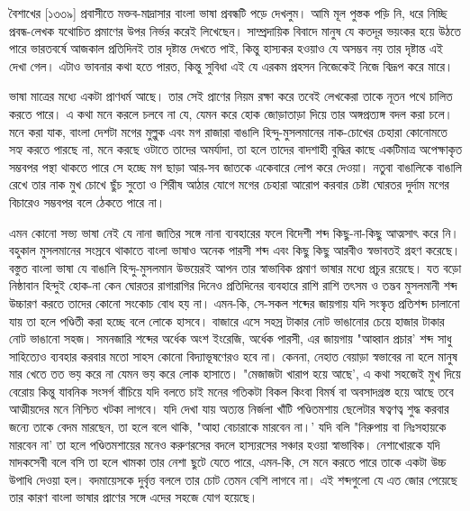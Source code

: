 \documentclass[a4paper,11pt]{article}
\date{\today}
\begin{document}
%
\maketitle
\pagestyle{fancy}
\begin{multicols}{3}{

\begin{spacing}{1.15}
\bn বৈশাখের [১৩৩৯] প্রবাসীতে মক্তব-মাদ্রাসার বাংলা ভাষা প্রবন্ধটি পড়ে দেখলুম। আমি মূল পুস্তক পড়ি নি, ধরে নিচ্ছি প্রবন্ধ-লেখক যথোচিত প্রমাণের উপর নির্ভর করেই লিখেছেন। সাম্প্রদায়িক বিবাদে মানুষ যে কতদূর ভয়ংকর হয়ে উঠতে পারে ভারতবর্ষে আজকাল প্রতিদিনই তার দৃষ্টান্ত দেখতে পাই, কিন্তু হাস্যকর হওয়াও যে অসম্ভব নয় তার দৃষ্টান্ত এই দেখা গেল। এটাও ভাবনার কথা হতে পারত, কিন্তু সুবিধা এই যে এরকম প্রহসন নিজেকেই নিজে বিদ্রূপ করে মারে।

ভাষা মাত্রের মধ্যে একটা প্রাণধর্ম আছে। তার সেই প্রাণের নিয়ম রক্ষা করে তবেই লেখকেরা তাকে নূতন পথে চালিত করতে পারে। এ কথা মনে করলে চলবে না যে, যেমন করে হোক জোড়াতাড়া দিয়ে তার অঙ্গপ্রত্যঙ্গ বদল করা চলে। মনে করা যাক, বাংলা দেশটা মগের মুল্লুক এবং মগ রাজারা বাঙালি হিন্দু-মুসলমানের নাক-চোখের চেহারা কোনোমতে সহ্য করতে পারছে না, মনে করছে ওটাতে তাদের অমর্যাদা, তা হলে তাদের বাদশাহী বুদ্ধির কাছে একটিমাত্র অপেক্ষাকৃত সম্ভবপর পন্থা থাকতে পারে সে হচ্ছে মগ ছাড়া আর-সব জাতকে একেবারে লোপ করে দেওয়া। নতুবা বাঙালিকে বাঙালি রেখে তার নাক মুখ চোখে ছুঁচ সুতো ও শিরীষ আঠার যোগে মগের চেহারা আরোপ করবার চেষ্টা ঘোরতর দুর্দাম মগের বিচারেও সম্ভবপর বলে ঠেকতে পারে না।

এমন কোনো সভ্য ভাষা নেই যে নানা জাতির সঙ্গে নানা ব্যবহারের ফলে বিদেশী শব্দ কিছু-না-কিছু আত্মসাৎ করে নি। বহুকাল মুসলমানের সংস্রবে থাকাতে বাংলা ভাষাও অনেক পারসী শব্দ এবং কিছু কিছু আরবীও স্বভাবতই গ্রহণ করেছে। বস্তুত বাংলা ভাষা যে বাঙালি হিন্দু-মুসলমান উভয়েরই আপন তার স্বাভাবিক প্রমাণ ভাষার মধ্যে প্রচুর রয়েছে। যত বড়ো নিষ্ঠাবান হিন্দুই হোক-না কেন ঘোরতর রাগারাগির দিনেও প্রতিদিনের ব্যবহারে রাশি রাশি তৎসম ও তদ্ভব মুসলমানী শব্দ উচ্চারণ করতে তাদের কোনো সংকোচ বোধ হয় না। এমন-কি, সে-সকল শব্দের জায়গায় যদি সংস্কৃত প্রতিশব্দ চালানো যায় তা হলে পণ্ডিতী করা হচ্ছে বলে লোকে হাসবে। বাজারে এসে সহস্র টাকার নোট ভাঙানোর চেয়ে হাজার টাকার নোট ভাঙানো সহজ। সমনজারি শব্দের অর্ধেক অংশ ইংরেজি, অর্ধেক পারসী, এর জায়গায় "আহ্বান প্রচার' শব্দ সাধু সাহিত্যেও ব্যবহার করবার মতো সাহস কোনো বিদ্যাভূষণেরও হবে না। কেননা, নেহাত বেয়াড়া স্বভাবের না হলে মানুষ মার খেতে তত ভয় করে না যেমন ভয় করে লোক হাসাতে। "মেজাজটা খারাপ হয়ে আছে', এ কথা সহজেই মুখ দিয়ে বেরোয় কিন্তু যাবনিক সংসর্গ বাঁচিয়ে যদি বলতে চাই মনের গতিকটা বিকল কিংবা বিমর্ষ বা অবসাদগ্রস্ত হয়ে আছে তবে আত্মীয়দের মনে নিশ্চিত খটকা লাগবে। যদি দেখা যায় অত্যন্ত নির্জলা খাঁটি পণ্ডিতমশায় ছেলেটার ষত্বণত্ব শুদ্ধ করবার জন্যে তাকে বেদম মারছেন, তা হলে বলে থাকি, "আহা বেচারাকে মারবেন না।' যদি বলি "নিরুপায় বা নিঃসহায়কে মারবেন না' তা হলে পণ্ডিতমশায়ের মনেও করুণরসের বদলে হাস্যরসের সঞ্চার হওয়া স্বাভাবিক। নেশাখোরকে যদি মাদকসেবী বলে বসি তা হলে খামকা তার নেশা ছুটে যেতে পারে, এমন-কি, সে মনে করতে পারে তাকে একটা উচ্চ উপাধি দেওয়া হল। বদমায়েসকে দুর্বৃত্ত বললে তার চোট তেমন বেশি লাগবে না। এই শব্দগুলো যে এত জোর পেয়েছে তার কারণ বাংলা ভাষার প্রাণের সঙ্গে এদের সহজে যোগ হয়েছে।


\end{spacing}}
\end{multicols}
\end{document}
